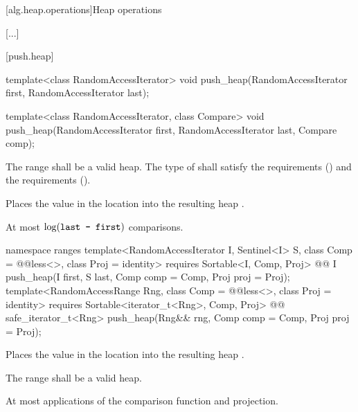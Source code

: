 [alg.heap.operations]{Heap operations}

[...]

[push.heap]{}

%
\begin{itemdecl}
template<class RandomAccessIterator>
  void push_heap(RandomAccessIterator first, RandomAccessIterator last);

template<class RandomAccessIterator, class Compare>
  void push_heap(RandomAccessIterator first, RandomAccessIterator last,
                 Compare comp);
\end{itemdecl}

\begin{itemdescr}
\pnum
\requires
The range
shall be a valid heap.
The type of  shall satisfy
the  requirements
() and the
 requirements
().

\pnum
\effects
Places the value in the location
into the resulting heap
.

\pnum
\complexity
At most
$\log(\texttt{last - first})$
comparisons.
\end{itemdescr}

\begin{addedblock}
%
\begin{itemdecl}
namespace ranges {
  template<RandomAccessIterator I, Sentinel<I> S, class Comp = @@less<>,
      class Proj = identity>
    requires Sortable<I, Comp, Proj>
    @@ I
      push_heap(I first, S last, Comp comp = Comp{}, Proj proj = Proj{});
  template<RandomAccessRange Rng, class Comp = @@less<>, class Proj = identity>
    requires Sortable<iterator_t<Rng>, Comp, Proj>
    @@ safe_iterator_t<Rng>
      push_heap(Rng&& rng, Comp comp = Comp{}, Proj proj = Proj{});
}
\end{itemdecl}

\begin{itemdescr}
\pnum
\effects
Places the value in the location
into the resulting heap
.

\pnum
\requires
The range
shall be a valid heap.

\pnum
\returns {}

\pnum
\complexity
At most
applications of the comparison function and projection.
\end{itemdescr}
\end{addedblock}

